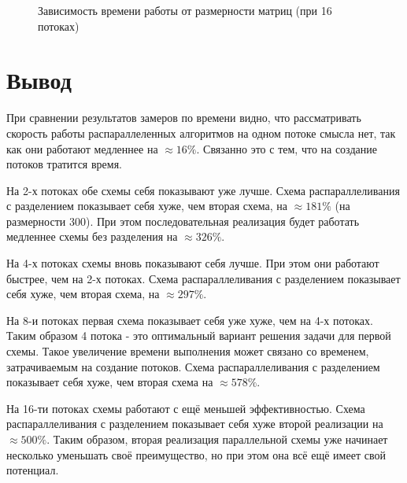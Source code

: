\documentclass[12pt]{report}
\begin{document}
\begin{figure}[h]
\begin{center}
	\captionsetup{justification=centering}
	\caption{Зависимость времени работы от размерности матриц (при 16 потоках)}
	\label{timeRes5}
	\end{center}
\end{figure}

\newpage

\section*{Вывод}
При сравнении результатов замеров по времени видно, что рассматривать скорость работы распараллеленных алгоритмов на одном потоке смысла нет, так как они работают медленнее на $\approx 16\%$. Связанно это с тем, что на создание потоков тратится время.

На 2-х потоках обе схемы себя показывают уже лучше. Схема распараллеливания с разделением показывает себя хуже, чем вторая схема, на $\approx 181\%$ (на размерности 300). При этом последовательная реализация будет работать медленнее схемы без разделения на $\approx 326\%$.

На 4-х потоках схемы вновь показывают себя лучше. При этом они работают быстрее, чем на 2-х потоках. Схема распараллеливания с разделением показывает себя хуже, чем вторая схема, на $\approx 297\%$.

На 8-и потоках первая схема показывает себя уже хуже, чем на 4-х потоках. Таким образом 4 потока - это оптимальный вариант решения задачи для первой схемы. Такое увеличение времени выполнения может связано со временем, затрачиваемым на создание потоков. Схема распараллеливания с разделением показывает себя хуже, чем вторая схема на $\approx 578\%$.

На 16-ти потоках схемы работают с ещё меньшей эффективностью. Схема распараллеливания с разделением показывает себя хуже второй реализации на $\approx 500\%$.  Таким образом, вторая реализация параллельной схемы уже начинает несколько уменьшать своё преимущество, но при этом она всё ещё имеет свой потенциал.
\end{document}
